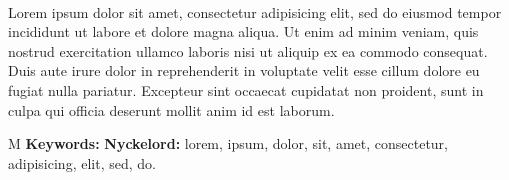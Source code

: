 \thesisImprintTitle\\
\thesisImprintSubtitle\\
\thesisAuthor\\
\thesisDepartment\\
\thesisUniversity

\thispagestyle{plain}           %
\section*{\abstractname}
Lorem ipsum dolor sit amet, consectetur adipisicing elit, sed do eiusmod tempor incididunt ut labore et dolore magna aliqua. Ut enim ad minim veniam, quis nostrud exercitation ullamco laboris nisi ut aliquip ex ea commodo consequat. Duis aute irure dolor in reprehenderit in voluptate velit esse cillum dolore eu fugiat nulla pariatur. Excepteur sint occaecat cupidatat non proident, sunt in culpa qui officia deserunt mollit anim id est laborum.

\vfill
\if\thesisType M
    \textbf{Keywords:}
\else
    \textbf{Nyckelord:}
\fi
lorem, ipsum, dolor, sit, amet, consectetur, adipisicing, elit, sed, do.

\if{}
\newpage                %
\thispagestyle{empty}
\mbox{}
\fi
